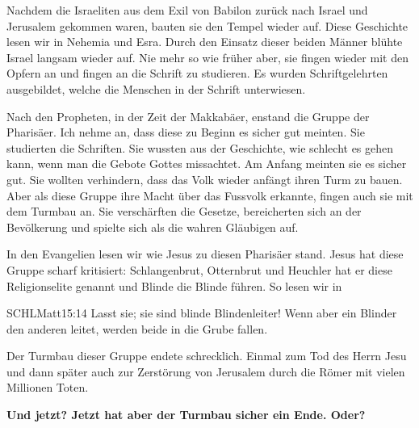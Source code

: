 \documentclass[14pt]{../../inc/mybib}
\newenvironment{block}[1][]{%
  \vspace{1.5em}%
  \noindent\textbf{#1}\par%
  \vspace{0.0em}%
}{%
  \vspace{1em}%
}
\begin{document}
\begin{block}
    Nachdem die Israeliten aus dem Exil von Babilon zurück nach Israel und Jerusalem gekommen waren, bauten sie den Tempel wieder auf. Diese Geschichte lesen wir in Nehemia und Esra. Durch den Einsatz dieser beiden Männer blühte Israel langsam wieder auf. Nie mehr so wie früher aber, sie fingen wieder mit den Opfern an und fingen an die Schrift zu studieren. Es wurden Schriftgelehrten ausgebildet, welche die Menschen in der Schrift unterwiesen. 
    
    Nach den Propheten, in der Zeit der Makkabäer, enstand die Gruppe der Pharisäer. Ich nehme an, dass diese zu Beginn es sicher gut meinten. Sie studierten die Schriften. Sie wussten aus der Geschichte, wie schlecht es gehen kann, wenn man die Gebote Gottes missachtet. Am Anfang meinten sie es sicher gut. Sie wollten verhindern, dass das Volk wieder anfängt ihren Turm zu bauen. Aber als diese Gruppe ihre Macht über das Fussvolk erkannte, fingen auch sie mit dem Turmbau an. Sie verschärften die Gesetze, bereicherten sich an der Bevölkerung und spielte sich als die wahren Gläubigen auf.
    
    In den Evangelien lesen wir wie Jesus zu diesen Pharisäer stand. Jesus hat diese Gruppe scharf kritisiert:  Schlangenbrut, Otternbrut und Heuchler hat er diese Religionselite genannt und Blinde die Blinde führen. So lesen wir in
    \begin{bibelbox}{SCHL}{Matt}{15:14}
        Lasst sie; sie sind blinde Blindenleiter! Wenn aber ein Blinder den anderen leitet, werden beide in die Grube fallen.
    \end{bibelbox} 
    Der Turmbau dieser Gruppe endete schrecklich. Einmal zum Tod des Herrn Jesu und dann später auch zur Zerstörung von Jerusalem durch die Römer mit vielen Millionen Toten. 
    
    \textbf{Und jetzt? Jetzt hat aber der Turmbau sicher ein Ende. Oder?}
\end{block}
\end{document}
